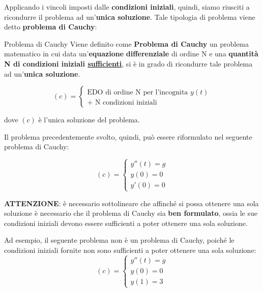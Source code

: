 \documentclass[a4paper, 12pt]{report}
\begin{document}
    \quad
    
    Applicando i vincoli imposti dalle \textbf{condizioni iniziali}, quindi, siamo riusciti a ricondurre il problema ad un'\textbf{unica soluzione}. Tale tipologia di problema viene detto \textbf{problema di Cauchy}:
    
    \begin{frameddefn}{Problema di Cauchy}
        Viene definito come \textbf{Problema di Cauchy} un problema matematico in cui data un'\textbf{equazione} \textbf{differenziale} di ordine N e una \textbf{quantità N di condizioni iniziali \underline{sufficienti}}, si è in grado di ricondurre tale problema ad un'\textbf{unica soluzione}.
        
        $$
        (c) = \left \{ \begin{array}{l}
            \text{EDO di ordine N per l'incognita } y(t) \\
            + \text{ N condizioni iniziali}
        \end{array}\right .
        $$
        
        dove $(c)$ è l'unica soluzione del problema.
    \end{frameddefn}
    
    Il problema precedentemente svolto, quindi, può essere riformulato nel seguente problema di Cauchy:
    
    $$
        (c) = \left \{ \begin{array}{l}
            y''(t) = g \\
            y(0) = 0 \\
            y'(0) = 0
        \end{array}\right .
    $$
    
    \textbf{ATTENZIONE}: è necessario sottolineare che affinché si possa ottenere una sola soluzione è necessario che il problema di Cauchy sia \textbf{ben formulato}, ossia le sue condizioni iniziali devono essere sufficienti a poter ottenere una sola soluzione.
    
    Ad esempio, il seguente problema non è un problema di Cauchy, poiché le condizioni iniziali fornite non sono sufficienti a poter ottenere una sola soluzione:
    $$
        (c) = \left \{ \begin{array}{l}
            y''(t) = g \\
            y(0) = 0 \\
            y(1) = 3
        \end{array}\right .
    $$
    
\end{document}
